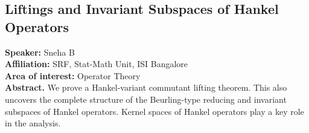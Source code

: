 \subsection*{Liftings and Invariant Subspaces of Hankel Operators} 
\noindent
\textbf{Speaker:} Sneha B \\ %
\textbf{Affiliation:} SRF, Stat-Math Unit, ISI Bangalore\\ %
\textbf{Area of interest:} Operator Theory \\

\noindent\textbf{Abstract.} We prove a Hankel-variant commutant lifting theorem. This also uncovers the complete structure of the Beurling-type reducing and invariant subspaces of Hankel operators. Kernel spaces of Hankel operators play a key role in the analysis.

